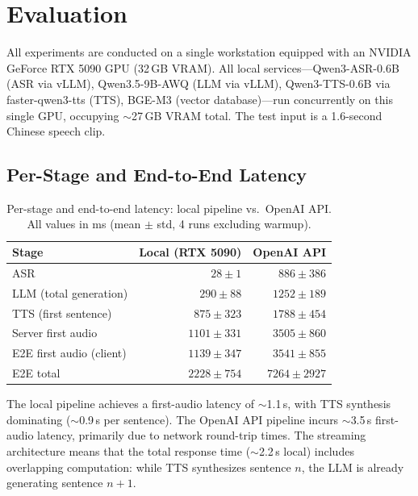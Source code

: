 \documentclass[11pt,a4paper]{article}
\begin{document}
\section{Evaluation}
\label{sec:evaluation}

All experiments are conducted on a single workstation equipped with an NVIDIA GeForce RTX 5090 GPU (32\,GB VRAM). All local services---Qwen3-ASR-0.6B (ASR via vLLM), Qwen3.5-9B-AWQ (LLM via vLLM), Qwen3-TTS-0.6B via faster-qwen3-tts (TTS), BGE-M3 (vector database)---run concurrently on this single GPU, occupying $\sim$27\,GB VRAM total. The test input is a 1.6-second Chinese speech clip.

\subsection{Per-Stage and End-to-End Latency}

\begin{table}[h]
    \centering
    \caption{Per-stage and end-to-end latency: local pipeline vs.\ OpenAI API. All values in ms (mean $\pm$ std, 4 runs excluding warmup).}
    \label{tab:latency}
    \begin{tabular}{lrr}
        \toprule
        \textbf{Stage} & \textbf{Local (RTX 5090)} & \textbf{OpenAI API} \\
        \midrule
        ASR                     & $28 \pm 1$      & $886 \pm 386$ \\
        LLM (total generation)  & $290 \pm 88$    & $1252 \pm 189$ \\
        TTS (first sentence)    & $875 \pm 323$   & $1788 \pm 454$ \\
        \midrule
        Server first audio      & $1101 \pm 331$  & $3505 \pm 860$ \\
        E2E first audio (client)& $1139 \pm 347$  & $3541 \pm 855$ \\
        E2E total               & $2228 \pm 754$  & $7264 \pm 2927$ \\
        \bottomrule
    \end{tabular}
\end{table}

The local pipeline achieves a first-audio latency of $\sim$1.1\,s, with TTS synthesis dominating ($\sim$0.9\,s per sentence). The OpenAI API pipeline incurs $\sim$3.5\,s first-audio latency, primarily due to network round-trip times. The streaming architecture means that the total response time ($\sim$2.2\,s local) includes overlapping computation: while TTS synthesizes sentence $n$, the LLM is already generating sentence $n{+}1$.
\end{document}
